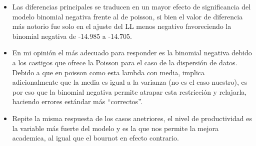 \documentclass[11pt]{article}
\providecommand{\tightlist}{%
      \setlength{\itemsep}{0pt}\setlength{\parskip}{0pt}}
\begin{document}
\begin{itemize}
\tightlist
\item
  Las diferencias principales se traducen en un mayor efecto de
  significancia del modelo binomial negativa frente al de poisson, si
  bien el valor de diferencia más notorio fue solo en el ajuste del LL
  menos negativo favoreciendo la binomial negativa de -14.985 a -14.705.
\item
  En mi opinión el más adecuado para responder es la binomial negativa
  debido a los castigos que ofrece la Poisson para el caso de la
  dispersión de datos. Debido a que en poisson como esta lambda con
  media, implica adicionalmente que la media es igual a la varianza (no
  es el caso nuestro), es por eso que la binomial negativa permite
  atrapar esta restricción y relajarla, haciendo errores estándar más
  ``correctos''.
\item
  Repite la misma respuesta de los casos anetriores, el nivel de
  productividad es la variable más fuerte del modelo y es la que nos
  permite la mejora academica, al igual que el bournot en efecto
  contrario.
\end{itemize}


    
    
    
\end{document}
